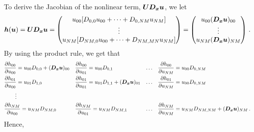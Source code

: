 To derive the Jacobian of the nonlinear term, $\bm{U}\bm{D_x}\bm{u}$, we let
\[
  \bm{h}(\bm{u}) = \bm{U}\bm{D_x} \bm{u} =
  \begin{pmatrix}
    u_{00}[D_{0,0}u_{00} + \dots + D_{0,NM}u_{NM}]
    \\
    \vdots 
    \\
    u_{NM}[D_{NM,0} u_{00} + \dots + D_{NM,MN}u_{NM}]
  \end{pmatrix}
  = 
  \begin{pmatrix}
    u_{00}(\bm{D_x} \bm{u})_{00}
    \\
    \vdots 
    \\
    u_{NM}(\bm{D_x} \bm{u})_{NM}
  \end{pmatrix}
  \, .
\]
By using the product rule, we get that
{\footnotesize
\begin{align*}
  &\frac{\partial h_{00}}{\partial u_{00}} = u_{00} D_{0,0} + (\bm{D_x} \bm{u})_{00}
  &&\frac{\partial h_{00}}{\partial u_{01}} = u_{00} D_{0,1} 
  & \dots\quad 
  &\frac{\partial h_{00}}{\partial u_{NM}} = u_{00}D_{0,NM}
  \\
  &\frac{\partial h_{01}}{\partial u_{00}} = u_{01} D_{1,0}
  &&\frac{\partial h_{01}}{\partial u_{01}} = u_{01} D_{1,1} + (\bm{D_x} \bm{u})_{01}
  & \dots \quad
  &\frac{\partial h_{01}}{\partial u_{NM}} = u_{00}D_{0,NM}
  \\
  & \quad \quad \vdots 
  \\
  &\frac{\partial h_{NM}}{\partial u_{00}} = u_{NM} D_{NM,0}
  &&\frac{\partial h_{NM}}{\partial u_{01}} = u_{NM} D_{NM,1}
  & \dots\quad
  &\frac{\partial h_{NM}}{\partial u_{NM}} = u_{NM} D_{NM,NM} + (\bm{D_x} \bm{u})_{NM}
  \, .
\end{align*}
}
Hence,

